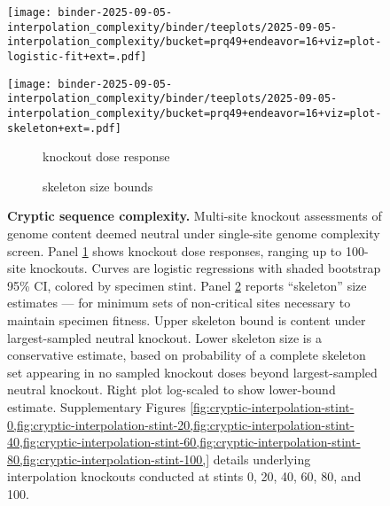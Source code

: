 \begin{figure}

\begin{minipage}{\linewidth}
\centering
\begin{minipage}{0.4\linewidth}
\texttt{[image: binder-2025-09-05-interpolation\_complexity/binder/teeplots/2025-09-05-interpolation\_complexity/bucket=prq49+endeavor=16+viz=plot-logistic-fit+ext=.pdf]}
\end{minipage}%
\begin{minipage}{0.6\linewidth}
\texttt{[image: binder-2025-09-05-interpolation\_complexity/binder/teeplots/2025-09-05-interpolation\_complexity/bucket=prq49+endeavor=16+viz=plot-skeleton+ext=.pdf]}
\end{minipage}
\end{minipage}

\vspace{-1ex}\textsc{}

\begin{minipage}{\linewidth}
\centering
\begin{subfigure}[t]{0.4\linewidth}
\caption{\footnotesize knockout dose response}
\label{fig:cryptic:logistic}
\end{subfigure}%
\begin{subfigure}[t]{0.6\linewidth}
\caption{\footnotesize skeleton size bounds}
\label{fig:cryptic:skeleton}
\end{subfigure}
\end{minipage}

\caption{
\textbf{Cryptic sequence complexity.}
Multi-site knockout assessments of genome content deemed neutral under single-site genome complexity screen.
Panel \ref{fig:cryptic:logistic} shows knockout dose responses, ranging up to 100-site knockouts.
Curves are logistic regressions with shaded bootstrap 95\% CI, colored by specimen stint.
Panel \ref{fig:cryptic:skeleton} reports ``skeleton'' size estimates --- for minimum sets of non-critical sites necessary to maintain specimen fitness.
Upper skeleton bound is content under largest-sampled neutral knockout.
Lower skeleton size is a conservative estimate, based on probability of a complete skeleton set appearing in no sampled knockout doses beyond largest-sampled neutral knockout.
Right plot log-scaled to show lower-bound estimate.
Supplementary Figures \cref{fig:cryptic-interpolation-stint-0,fig:cryptic-interpolation-stint-20,fig:cryptic-interpolation-stint-40,fig:cryptic-interpolation-stint-60,fig:cryptic-interpolation-stint-80,fig:cryptic-interpolation-stint-100,} details underlying interpolation knockouts conducted at stints 0, 20, 40, 60, 80, and 100.
}
\label{fig:cryptic}

\end{figure}
